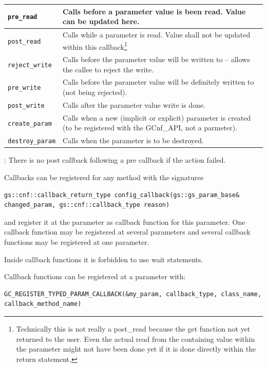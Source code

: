 \noindent
\begin{tabularx}{\textwidth}{|p{3.6cm}|X|}
	\hline
    \lstinline|pre_read| & Calls before a parameter value is been read. Value can be updated here. \\
	\hline
    \lstinline|post_read| & Calls while a parameter is read. Value shall not be updated within this callback\footnote{Technically this is not really a post\_read because the get function not yet returned to the user. Even the actual read from the containing value within the parameter might not have been done yet if it is done directly within the return statement.} \\
	\hline
    \lstinline|reject_write| & Calls before the parameter value will be written to -- allows the callee to reject the write. \\
	\hline
    \lstinline|pre_write| & Calls before the parameter value will be definitely written to (not being rejected). \\
	\hline
    \lstinline|post_write| & Calls after the parameter value write is done. \\
	\hline
    \lstinline|create_param| & Calls when a new (implicit or explicit) parameter is created (to be registered with the GCnf\_API, not a parmeter).\\
	\hline
    \lstinline|destroy_param| & Calls when the parameter is to be destroyed. \\
	\hline
\end{tabularx}


: There is no post callback following a pre callback if the action failed.

Callbacks can be registered for any method with the signatures
\begin{lstlisting}
gs::cnf::callback_return_type config_callback(gs::gs_param_base& changed_param, gs::cnf::callback_type reason)
\end{lstlisting}
and register it at the parameter as callback function for this parameter. One callback function may be registered at several parameters and several callback functions may be registered at one parameter. %

Inside callback functions it is forbidden to use wait statements.

Callback functions can be registered at a parameter with:
\begin{lstlisting}
GC_REGISTER_TYPED_PARAM_CALLBACK(&my_param, callback_type, class_name, callback_method_name)
\end{lstlisting}

